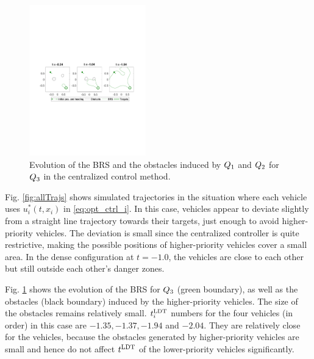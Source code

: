 \begin{figure}[H]
  \centering
  \includegraphics[width=0.45\textwidth]{"fig/cc_rs3"}
  \caption{Evolution of the BRS and the obstacles induced by $Q_1$ and $Q_2$ for $Q_3$ in the centralized control method.}
  \label{fig:cc_rs3}
\end{figure}
%
Fig. \ref{fig:allTrajs} shows simulated trajectories in the situation where each vehicle uses $u^*_i(t, x_i)$ in \eqref{eq:opt_ctrl_i}. In this case, vehicles appear to deviate slightly from a straight line trajectory towards their targets, just enough to avoid higher-priority vehicles. The deviation is small since the centralized controller is quite restrictive, making the possible positions of higher-priority vehicles cover a small area. In the dense configuration at $t=-1.0$, the vehicles are close to each other but still outside each other's danger zones.

Fig. \ref{fig:cc_rs3} shows the evolution of the BRS for $Q_3$ (green boundary), as well as the obstacles (black boundary) induced by the higher-priority vehicles. The size of the obstacles remains relatively small. $t^\text{LDT}_i$ numbers for the four vehicles (in order) in this case are $-1.35, -1.37, -1.94$ and $-2.04$. They are relatively close for the vehicles, because the obstacles generated by higher-priority vehicles are small and hence do not affect $t^\text{LDT}$ of the lower-priority vehicles significantly. 